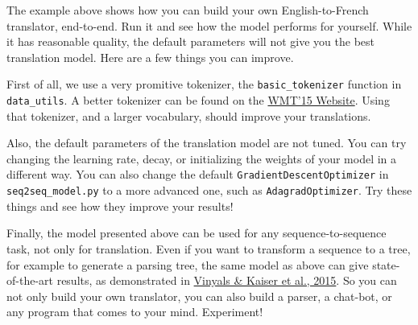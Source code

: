 The example above shows how you can build your own English-to-French
translator, end-to-end. Run it and see how the model performs for
yourself. While it has reasonable quality, the default parameters will
not give you the best translation model. Here are a few things you can
improve.

First of all, we use a very promitive tokenizer, the
\texttt{basic\_tokenizer} function in \texttt{data\_utils}. A better
tokenizer can be found on the
\href{http://www.statmt.org/wmt15/translation-task.html}{WMT'15
Website}. Using that tokenizer, and a larger vocabulary, should improve
your translations.

Also, the default parameters of the translation model are not tuned. You
can try changing the learning rate, decay, or initializing the weights
of your model in a different way. You can also change the default
\texttt{GradientDescentOptimizer} in \texttt{seq2seq\_model.py} to a
more advanced one, such as \texttt{AdagradOptimizer}. Try these things
and see how they improve your results!

Finally, the model presented above can be used for any
sequence-to-sequence task, not only for translation. Even if you want to
transform a sequence to a tree, for example to generate a parsing tree,
the same model as above can give state-of-the-art results, as
demonstrated in \href{http://arxiv.org/abs/1412.7449}{Vinyals \& Kaiser
et al., 2015}. So you can not only build your own translator, you can
also build a parser, a chat-bot, or any program that comes to your mind.
Experiment!